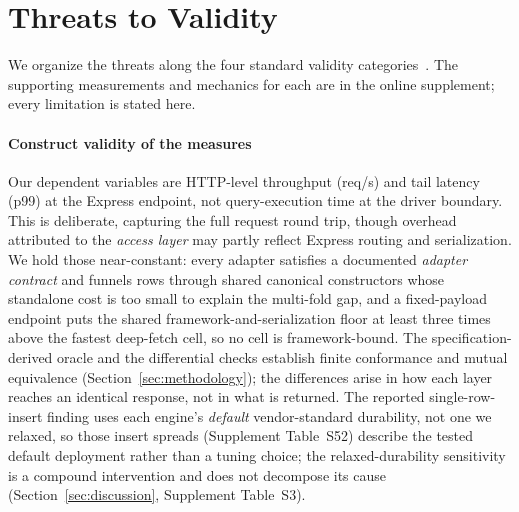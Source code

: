 \section{Threats to Validity}
\label{sec:threats}

We organize the threats along the four standard validity
categories~\cite{cook1979quasi,wohlin2012experimentation}.
The supporting measurements and mechanics for each are in the online supplement; every limitation is
stated here.

\paragraph{Construct validity of the measures}
Our dependent variables are HTTP-level throughput (req/s) and tail latency (p99) at the Express
endpoint, not query-execution time at the driver boundary.
This is deliberate, capturing the full request round trip, though overhead attributed to the
\emph{access layer} may partly reflect Express routing and serialization.
We hold those near-constant: every adapter satisfies a documented \emph{adapter contract} and funnels
rows through shared canonical constructors whose standalone cost is too small to explain the
multi-fold gap, and a fixed-payload endpoint puts the shared framework-and-serialization floor at
least three times above the fastest deep-fetch cell, so no cell is framework-bound.
The specification-derived oracle and the differential checks establish finite conformance and mutual
equivalence (Section~\ref{sec:methodology}); the differences arise in how each layer reaches an
identical response, not in what is returned.
The reported single-row-insert finding uses each engine's \emph{default} vendor-standard durability,
not one we relaxed, so those insert spreads (Supplement Table~S52) describe the tested default
deployment rather than a tuning choice; the relaxed-durability sensitivity is a compound
intervention and does not decompose its cause (Section~\ref{sec:discussion}, Supplement Table~S3).


